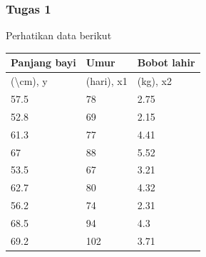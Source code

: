 \documentclass[a4paper,12pt]{article}
\begin{document}
\subsubsection{Tugas 1}
Perhatikan data berikut
\begin{table}[!ht]
	\begin{tabular}{|l|l|l|}
		\hline
		Panjang bayi            & Umur       & Bobot lahir \\ \hline
		(\textbackslash{}cm), y & (hari), x1 & (kg), x2    \\ \hline
		57.5                    & 78         & 2.75        \\ \hline
		52.8                    & 69         & 2.15        \\ \hline
		61.3                    & 77         & 4.41        \\ \hline
		67                      & 88         & 5.52        \\ \hline
		53.5                    & 67         & 3.21        \\ \hline
		62.7                    & 80         & 4.32        \\ \hline
		56.2                    & 74         & 2.31        \\ \hline
		68.5                    & 94         & 4.3         \\ \hline
		69.2                    & 102        & 3.71        \\ \hline
	\end{tabular}
\end{table}
\end{document}
